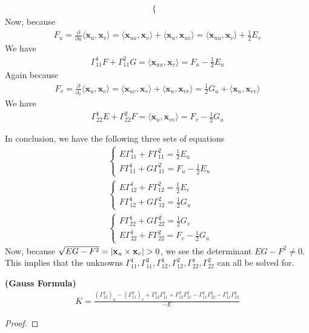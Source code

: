\documentclass{report}
\begin{document}
\begin{mdframed}
\begin{align*}
\begin{cases}
\end{cases}
\end{align*}
Now, because 
\begin{align*}
F_u=\frac{\partial}{\partial u}\langle \textbf{x}_u, \textbf{x}_v\rangle = \langle \textbf{x}_{uu},\textbf{x}_v\rangle  + \langle \textbf{x}_u, \textbf{x}_{uv}\rangle = \langle \textbf{x}_{uu},\textbf{x}_v\rangle + \frac{1}{2}E_v
\end{align*}
We have 
\begin{align}
\Gamma ^1_{11}F+ \Gamma^2_{11}G=\langle \textbf{x}_{uu},\textbf{x}_v\rangle =F_u - \frac{1}{2}E_u
\end{align}
Again because 
\begin{align*}
F_v = \frac{\partial }{\partial _v}\langle \textbf{x}_u ,\textbf{x}_v\rangle = \langle \textbf{x}_{uv},\textbf{x}_v\rangle + \langle \textbf{x}_u,\textbf{x}_{vv}\rangle = \frac{1}{2}G_u + \langle \textbf{x}_u ,\textbf{x}_{vv}\rangle 
\end{align*}
We have 
\begin{align}
\Gamma^1_{22}E+ \Gamma^2_{22}F= \langle \textbf{x}_u , \textbf{x}_{vv}\rangle = F_v- \frac{1}{2}G_u
\end{align}
\end{mdframed}
\begin{mdframed}
In conclusion, we have the following three sets of equations  
\begin{align*}
&\begin{cases}
E\Gamma^1_{11}+ F\Gamma ^2_{11}= \frac{1}{2}E_u \\
F\Gamma^1_{11}+G\Gamma^2_{11}= F_u-\frac{1}{2}E_u
\end{cases}\\
&\begin{cases}
  E\Gamma^1_{12}+ F\Gamma^2_{12}= \frac{1}{2}E_v\\
  F\Gamma^1_{12}+ G\Gamma^2_{12} =\frac{1}{2}G_u
\end{cases}\\
&\begin{cases}
  F\Gamma^1_{22}+ G\Gamma^2_{22} = \frac{1}{2}G_v\\
  E\Gamma^1_{22}+ F\Gamma^2_{22}= F_v -\frac{1}{2}G_u
\end{cases}
\end{align*}
Now, because $\sqrt{EG-F^2}= \abso{\textbf{x}_u \times \textbf{x}_v}>0$, we see the determinant  $EG-F^2\neq 0$. This implies that the unknowns $\Gamma^1_{11},\Gamma^2_{11},\Gamma^1_{12},\Gamma^2_{12},\Gamma^1_{22},\Gamma^2_{22}$ can all be solved for.
\end{mdframed}
\begin{theorem}
\textbf{(Gauss Formula)} 
\begin{align*}
  K= \frac{(\Gamma ^2_{12})_u - (\Gamma^2_{11})_v + \Gamma^1_{12} \Gamma^2_{11} + \Gamma^2_{12}\Gamma^2_{21}- \Gamma^2_{11}\Gamma^2_{22}-\Gamma^1_{11}\Gamma^2_{12}}{-E}
\end{align*}
\end{theorem}
\begin{proof}

\end{proof}
\end{document}
